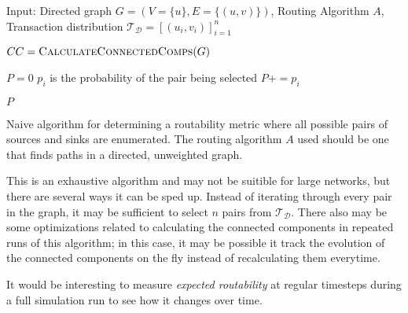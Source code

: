 \documentclass{article}
\theoremstyle{definition}
\begin{document}
\begin{algorithm}[!htb]
\begin{algorithmic}
  \State Input: Directed graph $G=(V=\{ u\}, E=\{ (u,v)\})$, Routing Algorithm $A$, Transaction distribution $\mathcal{T}_{\mathcal{D}}=[(u_i, v_i)]_{i=1}^n$

  \State $CC = \textsc{CalculateConnectedComps}(G)$

  \State $P=0$
   \Comment $p_i$ is the probability of the pair being selected
  \State $P += p_i$
  \EndIf
  \EndFor

  \State \Return $P$
\end{algorithmic}
\caption{Naive algorithm for determining a routability metric where all possible pairs of sources and sinks are enumerated. The routing algorithm $A$ used should be one that finds paths in a directed, unweighted graph.}
\label{alg:expectedroutability}
\end{algorithm}

This is an exhaustive algorithm and may not be suitible for large networks, but there are several ways it can be sped up. Instead of iterating through every pair in the graph, it may be sufficient to select $n$ pairs from $\mathcal{T}_{\mathcal{D}}$. There also may be some optimizations related to calculating the connected components in repeated runs of this algorithm; in this case, it may be possible it track the evolution of the connected components on the fly instead of recalculating them everytime.

It would be interesting to measure \emph{expected routability} at regular timesteps during a full simulation run to see how it changes over time.




\end{document}
